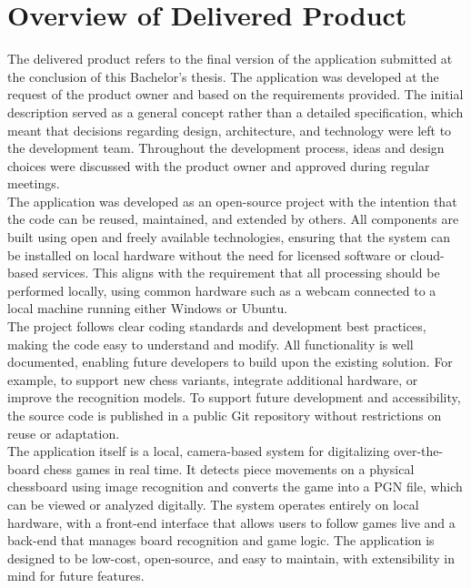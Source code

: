 \section{Overview of Delivered Product}
The delivered product refers to the final version of the application submitted at the conclusion of this Bachelor’s thesis. The application was developed at the request of the product owner and based on the requirements provided. The initial description served as a general concept rather than a detailed specification, which meant that decisions regarding design, architecture, and technology were left to the development team. Throughout the development process, ideas and design choices were discussed with the product owner and approved during regular meetings. \\

The application was developed as an open-source project with the intention that the code can be reused, maintained, and extended by others. All components are built using open and freely available technologies, ensuring that the system can be installed on local hardware without the need for licensed software or cloud-based services. This aligns with the requirement that all processing should be performed locally, using common hardware such as a webcam connected to a local machine running either Windows or Ubuntu. \\

The project follows clear coding standards and development best practices, making the code easy to understand and modify. All functionality is well documented, enabling future developers to build upon the existing solution. For example, to support new chess variants, integrate additional hardware, or improve the recognition models. To support future development and accessibility, the source code is published in a public Git repository without restrictions on reuse or adaptation. \\

The application itself is a local, camera-based system for digitalizing over-the-board chess games in real time. It detects piece movements on a physical chessboard using image recognition and converts the game into a PGN file, which can be viewed or analyzed digitally. The system operates entirely on local hardware, with a front-end interface that allows users to follow games live and a back-end that manages board recognition and game logic. The application is designed to be low-cost, open-source, and easy to maintain, with extensibility in mind for future features.

